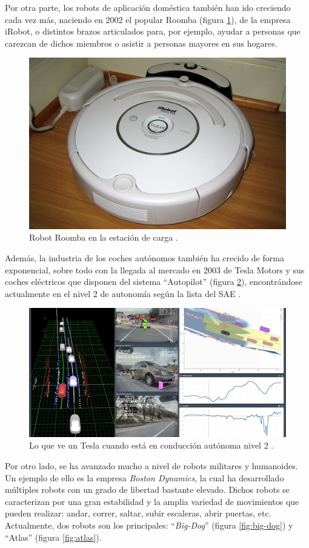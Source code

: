 Por otra parte, los robots de aplicación doméstica también han ido creciendo cada vez más,
naciendo en 2002 el popular Roomba (figura \ref{fig:roomba}), de la empresa iRobot, o distintos brazos articulados
para, por ejemplo, ayudar a personas que carezcan de dichos miembros o asistir a personas
mayores en sus hogares.

\begin{figure}[H]
    \centering
    \includegraphics[width=.5\linewidth]{pictures/Roomba3g.jpg}
    \caption{Robot Roomba en la estación de carga \cite{HistoryRobots2020a}.}
    \label{fig:roomba}
\end{figure}

Además, la industria de los coches autónomos también ha crecido de forma exponencial,
sobre todo con la llegada al mercado en 2003 de Tesla Motors y sus coches eléctricos
que disponen del sistema ``Autopilot'' (figura \ref{fig:ap}), encontrándose actualmente en el nivel 2 de
autonomía según la lista del SAE \cite{baldwinTeslaVideoShows2020a}\cite{TeslaFullSelfdrivinga}.

\begin{figure}[H]
    \centering
    \includegraphics[width=\linewidth]{pictures/tesla-automation.jpeg}
    \caption{Lo que ve un Tesla cuando está en conducción autónoma nivel 2 \cite{baldwinTeslaVideoShows2020a}.}
    \label{fig:ap}
\end{figure}

Por otro lado, se ha avanzado mucho a nivel de robots militares y humanoides. Un ejemplo
de ello es la empresa \textit{Boston Dynamics}, la cual ha desarrollado múltiples robots
con un grado de libertad bastante elevado. Dichos robots se caracterizan por una gran 
estabilidad y la amplia variedad de movimientos que pueden realizar: andar, correr,
saltar, subir escaleras, abrir puertas, etc. Actualmente, dos robots son los principales:
``\textit{Big-Dog}'' (figura \ref{fig:big-dog}) y ``Atlas'' (figura \ref{fig:atlas}).

